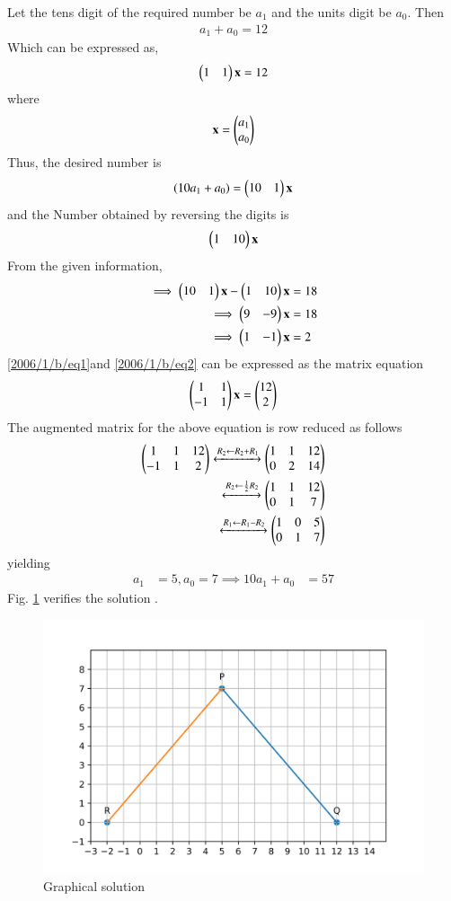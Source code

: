 Let the tens digit of the required number be ${a_1}$ and the units digit be ${a_0}$. Then
\begin{align}
    {a_1}+{a_0}=12
\end{align}
Which can be expressed as,
\begin{align}
     \begin{pmatrix}1&1\end{pmatrix}\mathbf{x}=12\label{2006/1/b/eq1}
\end{align}
where
\begin{align}
    \mathbf{x}=\begin{pmatrix}a_1\\a_0\end{pmatrix}
\end{align} 
Thus, the desired number  is 
\begin{align}
(10{a_1}+{a_0}) = 
    \begin{pmatrix}10&1\end{pmatrix}\mathbf{x}
\end{align}
and the Number obtained by reversing the digits is
\begin{align}
    \begin{pmatrix}1&10\end{pmatrix}\mathbf{x}
\end{align}
From the given information,  
\begin{align}
  \implies\begin{pmatrix}10&1\end{pmatrix}\mathbf{x}-\begin{pmatrix}1&10\end{pmatrix}\mathbf{x}&=18\\
   \implies\begin{pmatrix}9&-9\end{pmatrix}\mathbf{x}&=18 \\ 
  \implies\begin{pmatrix}1&-1\end{pmatrix}\mathbf{x}&=2\label{2006/1/b/eq2}
\end{align}
   \eqref{2006/1/b/eq1}and \eqref{2006/1/b/eq2} can be expressed as the matrix equation
 \begin{align}
    \begin{pmatrix}
    1 & 1 \\-1 & 1\end{pmatrix}\mathbf{x} = \begin{pmatrix}12\\2\end{pmatrix}
 \end{align}
The augmented matrix for the above equation
is row reduced as follows
\begin{align}
\begin{pmatrix}1&1&12\\-1&1&2\end{pmatrix}\xleftrightarrow{R_2\leftarrow R_2+ R_1} \begin{pmatrix}1&1&12\\0&2&14\end{pmatrix}
\\
\xleftrightarrow{R_2\leftarrow \frac{1}{2}R_2} \begin{pmatrix}1&1&12 \\ 0&1&7\end{pmatrix}
\\
\xleftrightarrow{R_1 \leftarrow R_1-R_2}
\begin{pmatrix}1&0&5\\0&1&7\end{pmatrix}
\end{align}
yielding 
 \begin{align}
{a_1}&=5, {a_0}=7
\implies 
        10 {a_1}+{a_0}
        &=57
    \end{align}
    Fig. \ref{2006/1/b/Fig:Graphical Solution} verifies the solution .
\begin{figure}[!ht]
    \centering
    \includegraphics[width= \columnwidth]{linear_forms/solutions/1/b/Figure.png}
    \caption{Graphical solution}
    \label{2006/1/b/Fig:Graphical Solution}
\end{figure}
